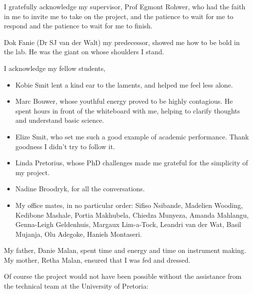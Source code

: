 \documentclass[
11pt, %
english, %
singlespacing, %
headsepline, %
]{MastersDoctoralThesis} %
\begin{document}

\begin{acknowledgements}
\addchaptertocentry{\acknowledgementname} %

I gratefully acknowledge my supervisor, Prof Egmont Rohwer, who had the faith in
me to invite me to take on the project, and the patience to wait for me to
respond and the patience to wait for me to finish. 

Dok Fanie (Dr SJ van der Walt) my predecessor, showed me how to be bold in the
lab. He was the giant on whose shoulders I stand.

I acknowledge my fellow students,
\begin{itemize} 
  
\item Kobie Smit lent a kind ear to the laments, and helped me feel less alone.

\item Marc Bouwer, whose youthful energy proved to be highly contagious. He
spent hours in front of the whiteboard with me, helping to clarify thoughts and
understand basic science.

\item Elize Smit, who set me such a good example of academic performance. Thank
goodness I didn't try to follow it.
 
\item Linda Pretorius, whose PhD challenges made me grateful for the simplicity
of my project.

\item Nadine Broodryk, for all the conversations.

\item My office mates, in no particular order: Sifiso Nsibande, Madelien
Wooding, Kedibone Mashale, Portia Makhubela, Chiedza Munyeza, Amanda Mahlangu,
Genna-Leigh Geldenhuis, Margaux Lim-a-Tock, Leandri van der Wat, Basil Mujanja,
Olu Adegoke, Hanieh Montaseri.

\end{itemize}

My father, Danie Malan, spent time and energy and time on instrument making. My
mother, Retha Malan, ensured that I was fed and dressed. 

Of course the project would not have been possible without the assistance from
the technical team at the University of Pretoria:


\end{acknowledgements}
\end{document}
